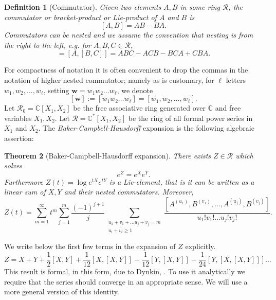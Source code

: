 \documentclass[11pt]{amsart}
\theoremstyle{plain}
\newtheorem{theorem}{Theorem}[section]
\newtheorem{definition}[theorem]{Definition}
\theoremstyle{remark}
\numberwithin{equation}{section}
\begin{document}
\begin{definition}[Commutator]
Given two elements $A, B$ in some ring $\mathcal{R}$,
\textit{the commutator} or \textit{bracket-product} or \textit{Lie-product} of $A$ and $B$ is 
$$[A,B]=AB-BA.$$
Commutators can be nested and we assume the convention that nesting is from the right to the left, e.g. for $A,B, C\in\mathcal{R}$,
\begin{equation}
[A,B,C]=[A,[B,C]]=ABC-ACB-BCA+CBA.
\end{equation}
\end{definition}
For compactness of notation it is often convenient to drop the commas in the notation of higher nested commutator;
namely as is customary, for $\ell$ letters $w_1,w_2,\ldots,w_{\ell}$, setting $\mathbf{w}=w_1w_2\ldots w_{\ell}$, we denote
\begin{equation}\label{eqn:word_nesting}
[\mathbf{w}]:=[w_1w_2\ldots w_{\ell}]=[w_1,w_2,\ldots, w_{\ell}].
\end{equation}
Let $\mathcal{R}_0=\mathbb{C}[X_1,X_2]$ be the free associative ring generated over 
$\mathbb{C}$
and free variables 
$X_1,X_2$. 
Let $\mathcal{R}=\mathbb{C}^*[X_1,X_2]$ be the ring of all formal power series in $X_1$ and $X_2$. The \textit{Baker-Campbell-Hausdorff} expansion is the following algebraic assertion:
\begin{theorem}[Baker-Campbell-Hausdorff expansion]\label{thm:bch}
There exists $Z\in\mathcal{R}$ which solves
\begin{equation}\label{eqn:non-com-log}
e^Z=e^Xe^Y.
\end{equation}
Furthermore $Z(t)=\log e^{tX}e^{tY}$ is a \textit{Lie-element}, that is it can be written as a linear sum of $X,Y$ and their nested commutators.
Moreover, 
\begin{equation}\label{eqn:dynkinbch}
Z(t)=
\sum_{m=1}^{\infty}t^m
\sum_{j=1}^m\frac{(-1)^{j+1}}{j}\sum_{\substack{u_1+v_1+\ldots u_j+v_j=m\\u_i+v_i\geq 1}}
\frac{\left[A^{(u_1)}, B^{(v_1)},\ldots, A^{(u_j)}, B^{(v_j)}\right]}{u_1!v_1!\ldots u_j!v_j!}.
\end{equation}
\end{theorem}

We write below the first few terms in the expansion of $Z$ explicitly. 
\begin{equation}\label{eqn:bch_liee}
Z=X+Y+\frac{1}{2}[X,Y]+\frac{1}{12}[X,[X,Y]]-\frac{1}{12}[Y,[X,Y]]-\frac{1}{24}[Y,[X,[X,Y]]]
\ldots
\end{equation}
This result is formal, in this form, due to Dynkin, \cite{Dyn}. To use it analytically we require that the series should converge in an appropriate sense. We will use a more general version of this identity. 
\end{document}
